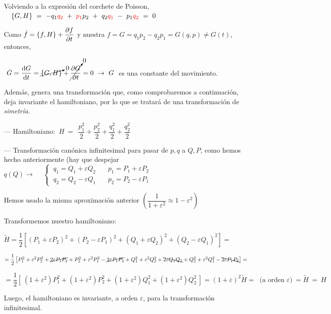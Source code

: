 Volviendo a la expresión del corchete de Poisson,
$\quad \{G,H\}\ = \ -q_1 \textcolor{red}{q_2} \ + \ \textcolor{red}{p_1} p_2 \ + \ q_2 \textcolor{red}{q_1} \ - \ p_1 \textcolor{red}{q_2} \ = \ 0$


Como $\dot f=\{f,H\}+\displaystyle \pdv{f}{t}$ y nuestra $f=G=q_1p_2-q_2p_1=G(q,p)\neq G(t)$, entonces, 

$\ \dot G=\displaystyle \dv{G}{t} =\cancelto{0}{\{G,H\}} + \displaystyle \cancelto{0}{\pdv{G}{t}} = 0 \ \to \ G \ $ es una constante del movimiento.


Además, genera una transformación que, como comprobaremos a continuación, deja invariante el hamiltoniano, por lo que se tratará de una transformación de \emph{simetría}.

--- Hamiltoniano: $ \ H \ = \ \ \dfrac {p_1^2} 2 + \dfrac {p_2^2} 2 + \dfrac {q_1^2} 2 + \dfrac {q_2^2} 2$

--- Transformación canónica infinitesimal para pasar de $p,q$ a $Q,P$, como hemos hecho anteriormente (hay que despejar $q(Q) \to  \quad \ \begin{cases} \ q_1=Q_1+\varepsilon Q_2 & \quad p_1=P_1+\varepsilon P_2 \\ \ q_2=Q_2-\varepsilon Q_1 &\quad p_2=P_2-\varepsilon P_1 \end{cases}$

\begin{footnotesize} \textcolor{gris}{Hemos usado la misma aproximación anterior $\left( \dfrac 1{1+\varepsilon^2}\approx  1-\varepsilon^2 \right)$ } \end{footnotesize}

Transformemos nuestro hamiltoniano:

$\widetilde H =\dfrac 1 2 \left[ (P_1+\varepsilon P_2)^2 + (P_2-\varepsilon P_1)^2 + (Q_1+\varepsilon Q_2)^2 + (Q_2-\varepsilon Q_1)^2 \right] =$

$=\dfrac 1 2 \left[ P_1^2 + \varepsilon^2 P_2^2 +\cancel{ 2 \varepsilon P_1 P_2} + P_2^2 + \varepsilon^2 P_1^2 -\cancel{ 2 \varepsilon P_1 P_2} +
	 Q_1^2 + \varepsilon^2 Q_2^2 +\bcancel{ 2 \varepsilon Q_1 Q_2}  +
	 Q_2^2 + \varepsilon^2 Q_1^2 -\bcancel{ 2 \varepsilon P_1 P_2} \right]=$
	 
$=\dfrac 1 2 [ \ (1+\varepsilon^2)P_1^2+ (1+\varepsilon^2)P_2^2+(1+\varepsilon^2)Q_1^2+(1+\varepsilon^2)Q_2^2 \ ] = (1+\varepsilon)^2 \widetilde H = \ \text{ (a orden } \varepsilon) \ = \widetilde H \ = \ H$

Luego, el hamiltoniano es invariante, a orden $\varepsilon$, para la transformación infinitesimal.

